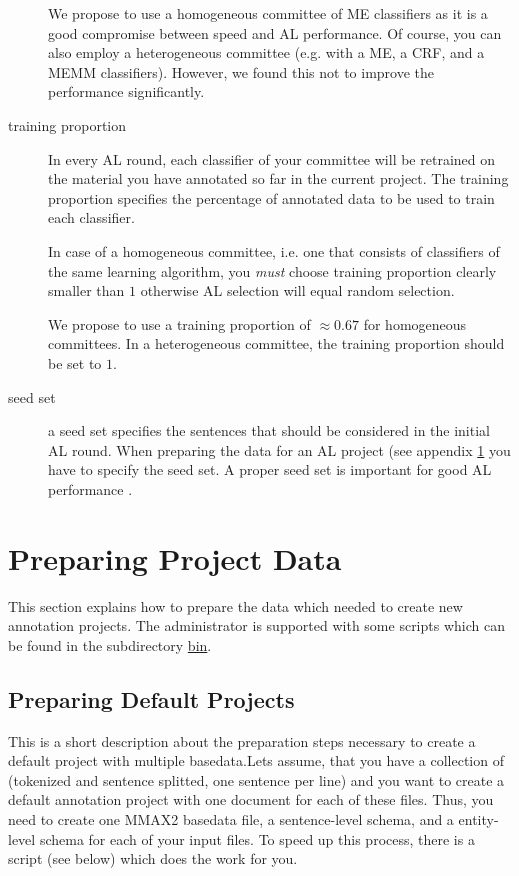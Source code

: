 \documentclass[DIV12,english,11pt,halfparskip]{scrartcl}
\begin{document}
\begin{appendix}
\begin{description}
  We propose to use a homogeneous committee of ME classifiers as it is
  a good compromise between speed and AL performance. Of course, you
  can also employ a heterogeneous committee (e.g. with a ME, a CRF,
  and a MEMM classifiers). However, we found this not to improve the
  performance significantly.

\item[training proportion] In every AL round, each classifier of your
  committee will be retrained on the material you have annotated so
  far in the current project. The training proportion specifies the
  percentage of annotated data to be used to train each classifier.

  In case of a homogeneous committee, i.e. one that consists of
  classifiers of the same learning algorithm, you \emph{must} choose
  training proportion clearly smaller than $1$ otherwise AL selection
  will equal random selection.

  We propose to use a training proportion of $\approx 0.67$ for
  homogeneous committees. In a heterogeneous committee, the training
  proportion should be set to $1$.


\item[seed set] a seed set specifies the sentences that should be
  considered in the initial AL round. When preparing the data for an
  AL project (see appendix \ref{appendix:preparation} you have to
  specify the seed set. A proper seed set is important for good AL
  performance \cite{Tomanek2007law}.

\end{description}



\section{Preparing Project Data}
\label{appendix:preparation}


This section explains how to prepare the data which needed to create
new annotation projects. The administrator is supported with some
scripts which can be found in the subdirectory \url{bin}.

\subsection{Preparing Default Projects}


This is a short description about the preparation steps necessary to
create a default project with multiple basedata.Lets assume, that you
have a collection of (tokenized and sentence splitted, one sentence
per line) and you want to create a default annotation project with one
document for each of these files. Thus, you need to create one MMAX2
basedata file, a sentence-level schema, and a entity-level schema for
each of your input files. To speed up this process, there is a script
(see below) which does the work for you.


\end{appendix}
\end{document}
